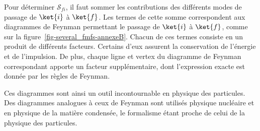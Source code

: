Pour déterminer $\mathcal{S}_{fi}$, il faut sommer les contributions des différents modes de passage de $\ket{i}$ à $\ket{f}$.
Les termes de cette somme correspondent aux diagrammes de Feynman permettant le passage de $\ket{i}$ à $\ket{f}$, comme sur la figure~\ref{fig-several_fmfs-annexeB}.
Chacun de ces termes consiste en un produit de différents facteurs.
Certains d'eux assurent la conservation de l'énergie et de l'impulsion.
De plus, chaque ligne et vertex du diagramme de Feynman correspondant apporte un facteur supplémentaire, dont l'expression exacte est donnée par les règles de Feynman.
\par Ces diagrammes sont ainsi un outil incontournable en physique des particules.
Des diagrammes analogues à ceux de Feynman sont utilisés physique nucléaire et en physique de la matière condensée, le formalisme étant proche de celui de la physique des particules.